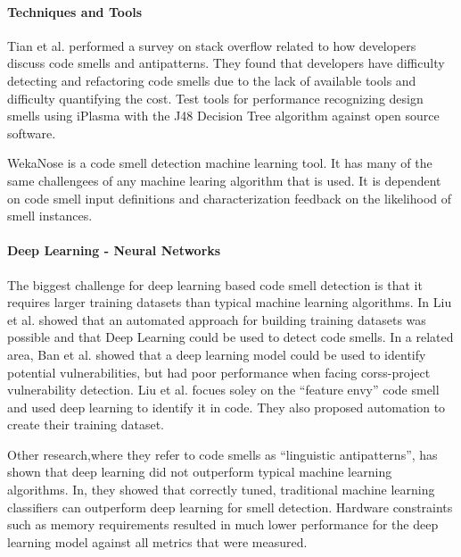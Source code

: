 \documentclass[conference]{IEEEtran}
\begin{document}
\paragraph{Techniques and Tools}
Tian et al.\cite{tian_how_2019} performed a survey on stack overflow related to how developers discuss code smells and antipatterns. 
They found that developers have difficulty detecting and refactoring code smells due to the lack of available tools and difficulty quantifying the cost.
Test tools for performance recognizing design smells using iPlasma with the J48 Decision Tree algorithm\cite{singh_systematic_2018} against open source software.

WekaNose is a code smell detection machine learning tool\cite{azadi_poster:_2018}. It has many of the same challengees of any machine learing algorithm that is used. It is dependent on code smell input definitions and characterization feedback on the likelihood of smell instances. 

\paragraph{Deep Learning - Neural Networks} The biggest challenge for deep learning based code smell detection\cite{liu_deep_2019} is that it requires larger training datasets than typical machine learning algorithms. In \cite{liu_deep_2019} Liu et al. showed that an automated approach for building training datasets was possible and that Deep Learning could be used to detect code smells.
In a related area, Ban et al. showed that a deep learning model could be used to identify potential vulnerabilities\cite{ban_performance_2019}, but had poor performance when facing corss-project vulnerability detection.
Liu et al. focues soley on the ``feature envy'' code smell and used deep learning to identify it in code. They also proposed automation to create their training dataset.

Other research\cite{fakhoury_keep_2018},where they refer to code smells as ``linguistic antipatterns'', has shown that deep learning did not outperform typical machine learning algorithms. In\cite{fakhoury_keep_2018}, they showed that correctly tuned, traditional machine learning classifiers can outperform deep learning for smell detection. Hardware constraints such as memory requirements resulted in much lower performance for the deep learning model against all metrics that were measured. 
\end{document}
